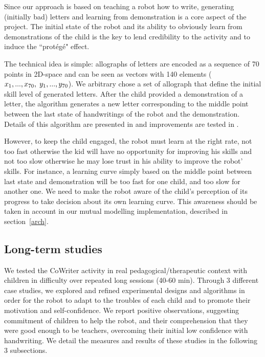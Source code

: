 \documentclass[10pt,a4paper]{article}
\begin{document}
Since our approach is based on teaching a robot how to write, generating (initially
bad) letters and learning from demonstration is a core aspect of the project.
The initial state of the robot and its ability to obviously learn from demonstrations of the child is the key to lend credibility to the activity and to induce the ``prot\'eg\'e" effect.

The technical idea is simple: allographs of letters are encoded as a sequence of 70 points in
2D-space and can be seen as vectors with 140 elements
($x_1,...,x_{70},\hspace{1mm}y_1,...,y_{70}$). We arbitrary chose a set of allograph
that define the initial skill level of generated letters. 
After the child provided a demonstration of a letter, the algorithm
generates a new letter corresponding to the middle point between the last state of handwritings of the robot and the demonstration. Details of this algorithm are presented in \cite{Hood} and improvements are tested in \cite{jacq2016building}.

However, to keep the child engaged, the robot must learn at the right rate, not too fast otherwise the kid will have
no opportunity for improving his skills and not too slow otherwise he may lose
trust in his ability to improve the robot' skills. For instance, a learning curve simply based on the middle point between last state and demonstration will be too fast for one child, and too slow for another one. 
We need to make the robot aware of the child's perception of its progress to take decision about its own learning curve. This awareness should be taken in account in our mutual modelling implementation, described in section~\ref{arch}. 

\subsection{Long-term studies}\label{long}
We tested the CoWriter activity in real pedagogical/therapeutic context with
children in difficulty over repeated long sessions (40-60 min). Through 3 different
case studies, we explored and refined experimental designs and algorithms in
order for the robot to adapt to the
troubles of each child and to promote their motivation and self-confidence. We report positive observations, suggesting commitment of children to help the
robot, and their comprehension that they were good enough to be teachers,
overcoming their initial low confidence with handwriting. We detail the measures and results of these studies in the following 3 subsections.
\end{document}
